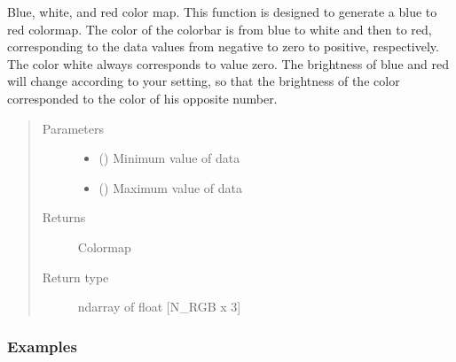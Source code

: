\documentclass[letterpaper,10pt,english,openany,oneside]{sphinxmanual}
\begin{document}
\begin{fulllineitems}
\label{\detokenize{pygpc:pygpc.Visualization.b2rcw}}
Blue, white, and red color map.
This function is designed to generate a blue to red colormap. The color of the colorbar is from blue to white and
then to red, corresponding to the data values from negative to zero to positive, respectively.
The color white always corresponds to value zero. The brightness of blue and red will change according to your
setting, so that the brightness of the color corresponded to the color of his opposite number.
\begin{quote}\begin{description}
\item[{Parameters}] \leavevmode\begin{itemize}
\item {} 
 () \textendash{} Minimum value of data

\item {} 
 () \textendash{} Maximum value of data

\end{itemize}

\item[{Returns}] \leavevmode
{} \textendash{} Colormap

\item[{Return type}] \leavevmode
ndarray of float {[}N\_RGB x 3{]}

\end{description}\end{quote}
\subsubsection*{Examples}

\begin{sphinxVerbatim}[commandchars=\\\{\}]
    
    
\end{sphinxVerbatim}

\end{fulllineitems}
\end{document}
